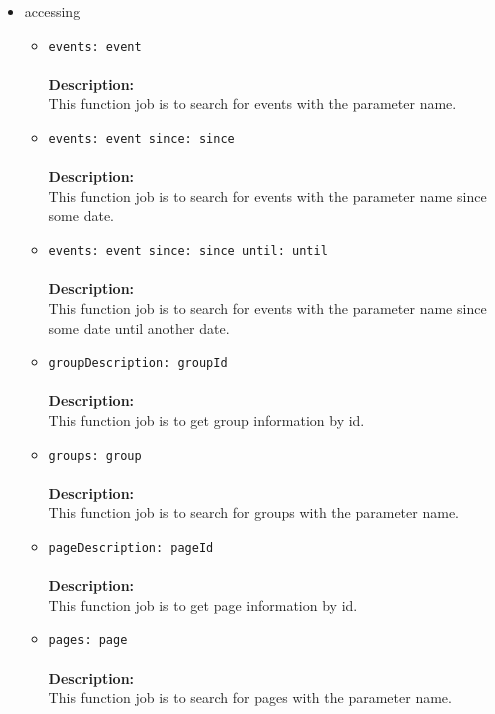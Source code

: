 \begin{itemize}
\begin{itemize}
\begin{itemize}
\item accessing
\label{sec-1-4-1-2-2-4}%
\begin{itemize}
\item \verb~events: event~\\\\
\textbf{Description:}\\
      This function job is to search for events with the parameter name.\\
\end{itemize}


\begin{itemize}
\item \verb~events: event since: since~\\\\
\textbf{Description:}\\
      This function job is to search for events with the parameter name since some date.\\
\item \verb~events: event since: since until: until~\\\\
\textbf{Description:}\\
      This function job is to search for events with the parameter name since some date until another date.\\
\item \verb~groupDescription: groupId~\\\\
\textbf{Description:}\\
      This function job is to get group information by id.\\
\item \verb~groups: group~\\\\
\textbf{Description:}\\
      This function job is to search for groups with the parameter name.\\
\item \verb~pageDescription: pageId~\\\\
\textbf{Description:}\\
      This function job is to get page information by id.\\
\item \verb~pages: page~\\\\
\textbf{Description:}\\
      This function job is to search for pages with the parameter name.\\

\end{itemize}
\end{itemize}
\end{itemize}
\end{itemize}
